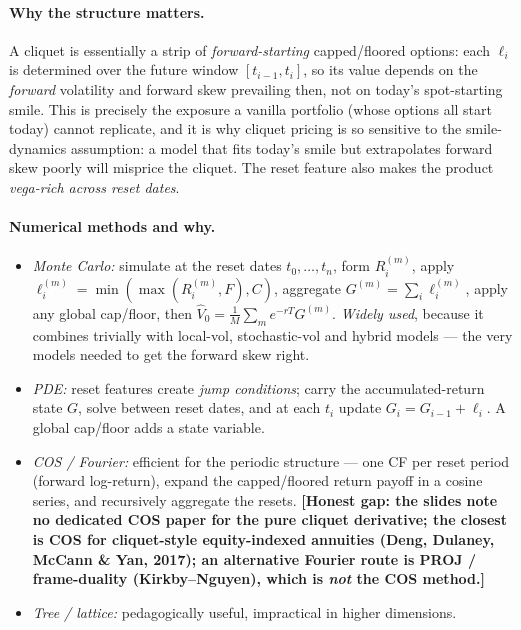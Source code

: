 \documentclass[11pt]{article}
\begin{document}
\paragraph{Why the structure matters.} A cliquet is essentially a strip of \emph{forward-starting}
capped/floored options: each $\ell_i$ is determined over the future window $[t_{i-1},t_i]$, so its
value depends on the \emph{forward} volatility and forward skew prevailing then, not on today's
spot-starting smile. This is precisely the exposure a vanilla portfolio (whose options all start
today) cannot replicate, and it is why cliquet pricing is so sensitive to the smile-dynamics
assumption: a model that fits today's smile but extrapolates forward skew poorly will misprice the
cliquet. The reset feature also makes the product \emph{vega-rich across reset dates}.

\paragraph{Numerical methods and why.}
\begin{itemize}[leftmargin=2em]
\item \emph{Monte Carlo:} simulate at the reset dates $t_0,\dots,t_n$, form
$R_i^{(m)}$, apply $\ell_i^{(m)}=\min(\max(R_i^{(m)},F),C)$, aggregate $G^{(m)}=\sum_i\ell_i^{(m)}$,
apply any global cap/floor, then $\hat V_0=\frac1M\sum_m e^{-rT}G^{(m)}$. \emph{Widely used}, because
it combines trivially with local-vol, stochastic-vol and hybrid models --- the very models needed to
get the forward skew right.
\item \emph{PDE:} reset features create \emph{jump conditions}; carry the accumulated-return state $G$,
solve between reset dates, and at each $t_i$ update $G_i=G_{i-1}+\ell_i$. A global cap/floor adds a
state variable.
\item \emph{COS / Fourier:} efficient for the periodic structure --- one CF per reset period
(forward log-return), expand the capped/floored return payoff in a cosine series, and recursively
aggregate the resets. \textbf{[Honest gap: the slides note no dedicated COS paper for the pure cliquet
derivative; the closest is COS for cliquet-style equity-indexed annuities (Deng, Dulaney, McCann \&
Yan, 2017); an alternative Fourier route is PROJ / frame-duality (Kirkby--Nguyen), which is \emph{not}
the COS method.]}
\item \emph{Tree / lattice:} pedagogically useful, impractical in higher dimensions.
\end{itemize}
\end{document}
